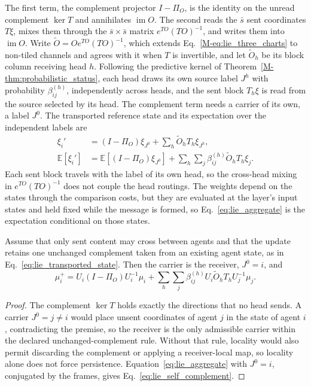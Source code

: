 \documentclass[twoside,11pt]{article}
\begin{document}
The first term, the complement projector $I-\Pi_O$, is the identity on the unread complement $\ker T$ and annihilates $\operatorname{im}O$. The second reads the $\bar s$ sent coordinates $T\xi$, mixes them through the $\bar s\times\bar s$ matrix $e^{TO}(TO)^{-1}$, and writes them into $\operatorname{im}O$. Write $\widetilde O=Oe^{TO}(TO)^{-1}$, which extends Eq.~\eqref{M-eq:lie_three_charts} to non-tiled channels and agrees with it when $T$ is invertible, and let $\widetilde O_h$ be its block column receiving head $h$. Following the predictive kernel of Theorem~\ref{M-thm:probabilistic_status}, each head draws its own source label $J^h$ with probability $\beta_{ij}^{(h)}$, independently across heads, and the sent block $T_h\xi$ is read from the source selected by its head. The complement term needs a carrier of its own, a label $J^0$. The transported reference state and its expectation over the independent labels are
\begin{align}
\xi_i'&=(I-\Pi_O)\xi_{J^0}+\sum_h\widetilde O_hT_h\xi_{J^h},
\label{eq:lie_transported_state}\\
\mathbb E[\xi_i']&=\mathbb E[(I-\Pi_O)\xi_{J^0}]+\sum_h\sum_j\beta_{ij}^{(h)}\widetilde O_hT_h\xi_j.
\label{eq:lie_aggregate}
\end{align}
Each sent block travels with the label of its own head, so the cross-head mixing in $e^{TO}(TO)^{-1}$ does not couple the head routings. The weights depend on the states through the comparison costs, but they are evaluated at the layer's input states and held fixed while the message is formed, so Eq.~\eqref{eq:lie_aggregate} is the expectation conditional on those states.

\begin{proposition}
\label{prop:lie_complement_persistence}
Assume that only sent content may cross between agents and that the update retains one unchanged complement taken from an existing agent state, as in Eq.~\eqref{eq:lie_transported_state}. Then the carrier is the receiver, $J^0=i$, and
\begin{equation}
\mu_i^+=U_i(I-\Pi_O)U_i^{-1}\mu_i+\sum_h\sum_j\beta_{ij}^{(h)}U_i\widetilde O_hT_hU_j^{-1}\mu_j.
\label{eq:lie_self_complement}
\end{equation}
\end{proposition}
\begin{proof}
The complement $\ker T$ holds exactly the directions that no head sends. A carrier $J^0=j\ne i$ would place unsent coordinates of agent $j$ in the state of agent $i$, contradicting the premise, so the receiver is the only admissible carrier within the declared unchanged-complement rule. Without that rule, locality would also permit discarding the complement or applying a receiver-local map, so locality alone does not force persistence. Equation~\eqref{eq:lie_aggregate} with $J^0=i$, conjugated by the frames, gives Eq.~\eqref{eq:lie_self_complement}.
\end{proof}
\end{document}
